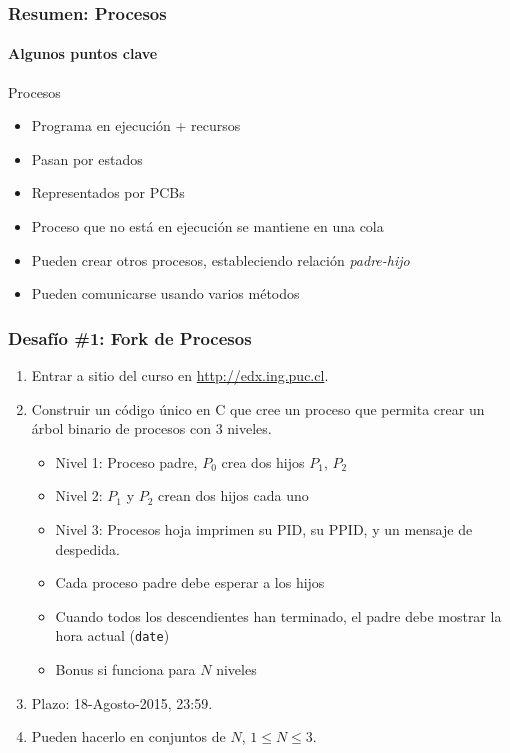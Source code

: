 \documentclass[letter]{beamer}
\begin{document}
\begin{frame}
  \frametitle{Resumen: Procesos}
  \framesubtitle{Algunos puntos clave}

  \begin{block}{Procesos}
    \begin{itemize}
    \item Programa en ejecución + recursos
    \item Pasan por estados
    \item Representados por PCBs
    \item Proceso que no está en ejecución se mantiene en una cola
    \item Pueden crear otros procesos, estableciendo relación {\em padre-hijo}
    \item Pueden comunicarse usando varios métodos
    \end{itemize}
  \end{block}

\end{frame}
\begin{frame}
  \frametitle{Desafío \#1: Fork de Procesos}

  \begin{enumerate}
    \item Entrar a sitio del curso en \url{http://edx.ing.puc.cl}.
    \item Construir un código único en C que cree un proceso que permita crear un árbol binario de procesos
          con $3$ niveles.
      \begin{itemize}
        \item Nivel 1: Proceso padre, $P_0$ crea dos hijos $P_1$, $P_2$
        \item Nivel 2: $P_1$ y $P_2$ crean dos hijos cada uno
        \item Nivel 3: Procesos hoja imprimen su PID, su PPID, y un mensaje de despedida.
        \item Cada proceso padre debe esperar a los hijos
        \item Cuando todos los descendientes han terminado, el padre debe mostrar la hora actual ({\tt date})
        \item Bonus si funciona para $N$ niveles
      \end{itemize}
    \item Plazo: 18-Agosto-2015, 23:59.
    \item Pueden hacerlo en conjuntos de $N$, $1 \leq N \leq 3$.
  \end{enumerate}
\end{frame}
\end{document}
